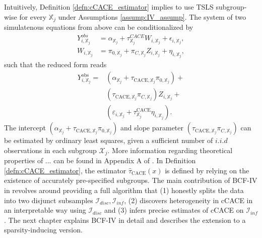 Intuitively, Definition \ref{defn:cCACE_estimator} implies to use TSLS subgroup-wise for every $\mathbb{X}_j$ under Assumptions \ref{assump:IV_assump}. The system of two simulatenous equations from above can be conditionalized by 
\begin{align*}
   Y_{i, \mathbb{X}_j}^{obs} &= \alpha_{\mathbb{X}_j} + \tau_{\mathbb{X}_j}^{CACE} W_{i, \mathbb{X}_j} + \epsilon_{i, \mathbb{X}_j}, \\
   W_{i, \mathbb{X}_j} &= \pi_{0, \mathbb{X}_j} + \pi_{C, \mathbb{X}_j} Z_{i, \mathbb{X}_j} + \eta_{i, \mathbb{X}_j},
\end{align*}
such that the reduced form reads 
\begin{align*}
   Y_{i,\mathbb{X}_j}^{\text{obs}} = &\left( \alpha_{\mathbb{X}_j} +
    \tau_{\text{CACE},\mathbb{X}_j} \pi_{0,\mathbb{X}_j} \right) + \\
     &\left( \tau_{\text{CACE},\mathbb{X}_j} \pi_{C,\mathbb{X}_j} \right) Z_{i,\mathbb{X}_j} + \\
     &\left( \varepsilon_{i,\mathbb{X}_j} + \tau^{\text{CACE}}_{\mathbb{X}_j} \eta_{i,\mathbb{X}_j} \right).
\end{align*}
The intercept $\left( \alpha_{\mathbb{X}_j} + \tau_{\text{CACE},\mathbb{X}_j} \pi_{0,\mathbb{X}_j} \right)$ and slope parameter $\left( \tau_{\text{CACE},\mathbb{X}_j} \pi_{C,\mathbb{X}_j} \right)$ can be estimated by ordinary least squares, given a sufficient number of $i.i.d$ observations in each subgroup $\mathcal{X}_j$. More information regarding theoretical properties of ... can be found in Appendix A of \cite{bargagli-stoffi_heterogeneous_2022}. In Definition \ref{defn:cCACE_estimator}, the estimator $\widehat\tau_{\text{CACE}}(x)$ is defined by relying on the existence of accurately pre-specified subgroups. The main contribution of BCF-IV in \cite{bargagli-stoffi_heterogeneous_2022} revolves around providing a full algorithm that (1) honestly splits the data into two disjunct subsamples $\mathcal{I}_{disc}, \mathcal{I}_{inf}$, (2) discovers heterogeneity in cCACE in an interpretable way using $\mathcal{I}_{disc}$ and (3) infers precise estimates of cCACE on $\mathcal{I}_{inf}$. The next chapter explains BCF-IV in detail and describes the extension to a sparsity-inducing version.




